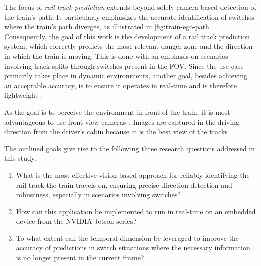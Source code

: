 The focus of \textit{rail track prediction} extends beyond solely camera-based detection of the train's path.
It particularly emphasizes the accurate identification of switches where the train's path diverges, as illustrated in \autoref{fig:train-ego-path}.
Consequently, the goal of this work is the development of a rail track prediction system, which correctly predicts the most relevant danger zone and the direction in which the train is moving.
This is done with an emphasis on scenarios involving track splits through switches present in the \ac{FOV}.
Since the use case primarily takes place in dynamic environments, another goal, besides achieving an acceptable accuracy, is to ensure it operates in real-time and is therefore lightweight \cite{tepNet2024}.

As the goal is to perceive the environment in front of the train, it is most advantageous to use front-view cameras \cite{tepNet2024} \cite{railNet2019}.
Images are captured in the driving direction from the driver's cabin because it is the best view of the tracks \cite{tepNet2024}.

\vspace{1cm} %

The outlined goals give rise to the following three research questions addressed in this study.

\begin{enumerate}
    \item What is the most effective vision-based approach for reliably identifying the rail track the train travels on, ensuring precise direction detection and robustness, especially in scenarios involving switches?
    \item How can this application be implemented to run in real-time on an embedded device from the NVIDIA Jetson series?
    \item To what extent can the temporal dimension be leveraged to improve the accuracy of predictions in switch situations where the necessary information is no longer present in the current frame?
\end{enumerate}

\vspace{2cm} %

